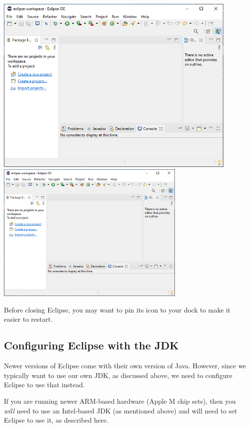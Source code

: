 \begin{center}
\iflatexml
   \includegraphics[]{images/EmptyEclipse}
\else
   \includegraphics[width=0.7\textwidth]{images/EmptyEclipse}
\fi
\end{center}

\ifMacOS
\begin{sideblock}
Before closing Eclipse, you may want to pin its icon to your dock
to make it easier to restart.
\end{sideblock}
\fi

\subsection{Configuring Eclipse with the JDK}

Newer versions of Eclipse come with their own version of Java. However, since
we typically want to use our own JDK, as discussed above, we need to configure
Eclipse to use that instead.

\ifMacOS
\begin{sideblock}
If you are running newer ARM-based hardware (Apple M chip sets), then
you {\it will} need to use an
Intel-based JDK (as mentioned above) and will need to set Eclipse to
use it, as described here.
\end{sideblock}
\fi

